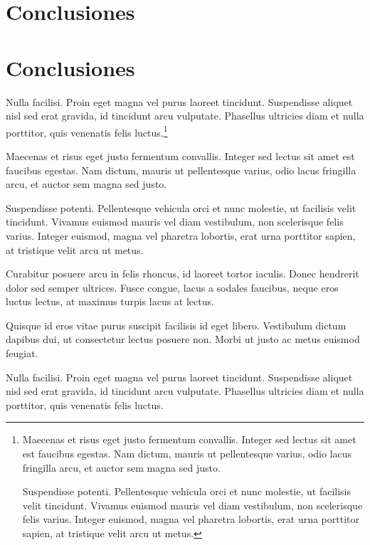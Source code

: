 \ifPDF
\chapter[\hspace{1.5pc}Conclusiones]{Conclusiones}
\setcounter{PrimPag}{\theCurrentPage}
	\else
	\ifHTMLEPUB
	\chapter{Conclusiones}
	\fi
\fi

Nulla facilisi. Proin eget magna vel purus laoreet tincidunt. Suspendisse aliquet nisl sed erat gravida, id tincidunt arcu vulputate. Phasellus ultricies diam et nulla porttitor, quis venenatis felis luctus.\footnote{Maecenas et risus eget justo fermentum convallis. Integer sed lectus sit amet est faucibus egestas. Nam dictum, mauris ut pellentesque varius, odio lacus fringilla arcu, et auctor sem magna sed justo.

	Suspendisse potenti. Pellentesque vehicula orci et nunc molestie, ut facilisis velit tincidunt. Vivamus euismod mauris vel diam vestibulum, non scelerisque felis varius. Integer euismod, magna vel pharetra lobortis, erat urna porttitor sapien, at tristique velit arcu ut metus.}

Maecenas et risus eget justo fermentum convallis. Integer sed lectus sit amet est faucibus egestas. Nam dictum, mauris ut pellentesque varius, odio lacus fringilla arcu, et auctor sem magna sed justo.

Suspendisse potenti. Pellentesque vehicula orci et nunc molestie, ut facilisis velit tincidunt. Vivamus euismod mauris vel diam vestibulum, non scelerisque felis varius. Integer euismod, magna vel pharetra lobortis, erat urna porttitor sapien, at tristique velit arcu ut metus.

Curabitur posuere arcu in felis rhoncus, id laoreet tortor iaculis. Donec hendrerit dolor sed semper ultrices. Fusce congue, lacus a sodales faucibus, neque eros luctus lectus, at maximus turpis lacus at lectus.

Quisque id eros vitae purus suscipit facilisis id eget libero. Vestibulum dictum dapibus dui, ut consectetur lectus posuere non. Morbi ut justo ac metus euismod feugiat.

Nulla facilisi. Proin eget magna vel purus laoreet tincidunt. Suspendisse aliquet nisl sed erat gravida, id tincidunt arcu vulputate. Phasellus ultricies diam et nulla porttitor, quis venenatis felis luctus.

